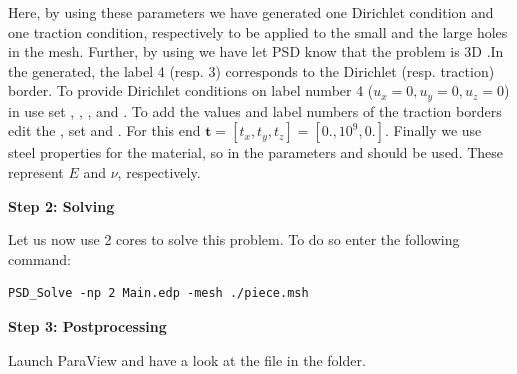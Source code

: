 Here, by using these parameters we have generated one Dirichlet
condition and one traction condition, respectively to be applied to the
small and the large holes in the mesh. Further, by using
 we have let PSD know that the problem is 3D .In the
 generated, the label 4 (resp. 3)
corresponds to the Dirichlet (resp. traction) border. To provide
Dirichlet conditions on label number 4 (\(u_x=0,u_y=0,u_z=0\)) in
 use set , ,
, and . To add the values and label
numbers of the traction borders edit the ,
set  and . For this end
\(\mathbf t=[t_x,t_y,t_z]=[0.,10^9,0.]\). Finally we use steel
properties for the material, so in  the
parameters  and  should be
used. These represent \(E\) and \(\nu\), respectively.

\textbf{Step 2: Solving}

Let us now use 2 cores to solve this problem. To do so enter the
following command:

\begin{lstlisting}[style=BashInputStyle]
PSD_Solve -np 2 Main.edp -mesh ./piece.msh
\end{lstlisting}

\textbf{Step 3: Postprocessing}

Launch ParaView and have a look at the  file in the
 folder.

